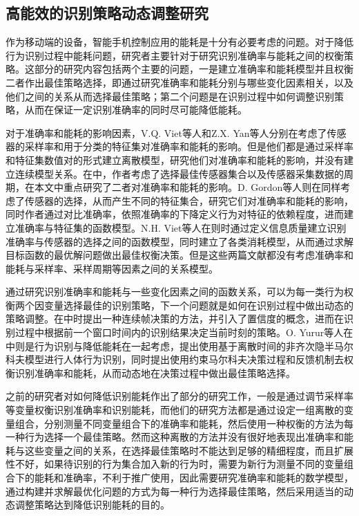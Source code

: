 \subsection{高能效的识别策略动态调整研究}
\par 作为移动端的设备，智能手机控制应用的能耗是十分有必要考虑的问题。对于降低行为识别过程中能耗问题，研究者主要针对于研究识别准确率与能耗之间的权衡策略。这部分的研究内容包括两个主要的问题，一是建立准确率和能耗模型并且权衡二者作出最佳策略选择，即通过研究准确率和能耗分别与哪些变化因素相关，以及他们之间的关系从而选择最佳策略；第二个问题是在识别过程中如何调整识别策略，从而在保证一定识别准确率的同时尽可能降低能耗。
\par 对于准确率和能耗的影响因素，V.Q. Viet等人和Z.X. Yan等人分别在\cite{fixPositionandOrientation2}\cite{modelVarialb}考虑了传感器的采样率和用于分类的特征集对准确率和能耗的影响。但是他们都是通过采样率和特征集数值对的形式建立离散模型，研究他们对准确率和能耗的影响，并没有建立连续模型关系。在\cite{sensorSet}中，作者考虑了选择最佳传感器集合以及传感器采集数据的周期，在本文中重点研究了二者对准确率和能耗的影响。D. Gordon等人则在\cite{sensorSetAndmodel}同样考虑了传感器的选择，从而产生不同的特征集合，研究它们对准确率和能耗的影响，同时作者通过对比准确率，依照准确率的下降定义行为对特征的依赖程度，进而建立准确率与特征集的函数模型。N.H. Viet等人在\cite{precionModel}则时通过定义信息质量建立识别准确率与传感器的选择之间的函数模型，同时建立了各类消耗模型，从而通过求解目标函数的最优解问题做出最佳权衡决策。但是这些两篇文献都没有考虑准确率和能耗与采样率、采样周期等因素之间的关系模型。
\par 通过研究识别准确率和能耗与一些变化因素之间的函数关系，可以为每一类行为权衡两个因变量选择最佳的识别策略，下一个问题就是如何在识别过程中做出动态的策略调整。在\cite{fixPositionandOrientation2}\cite{modelVarialb}中时提出一种连续帧决策的方法，并引入了置信度的概念，进而在识别过程中根据前一个窗口时间内的识别结果决定当前时刻的策略。O. Yurur等人在\cite{adapteStratery}中则是行为识别与降低能耗在一起考虑，提出使用基于离散时间的非齐次隐半马尔科夫模型进行人体行为识别，同时提出使用约束马尔科夫决策过程和反馈机制去权衡识别准确率和能耗，从而动态地在决策过程中做出最佳策略选择。
\par 之前的研究者对如何降低识别能耗作出了部分的研究工作，一般是通过调节采样率等变量权衡识别准确率和识别能耗，而他们的研究方法都是通过设定一组离散的变量组合，分别测量不同变量组合下的准确率和能耗，然后使用一种权衡的方法为每一种行为选择一个最佳策略。然而这种离散的方法并没有很好地表现出准确率和能耗与这些变量之间的关系，在选择最佳策略时不能达到足够的精细程度，而且扩展性不好，如果待识别的行为集合加入新的行为时，需要为新行为测量不同的变量组合下的能耗和准确率，不利于推广使用，因此需要研究准确率和能耗的数学模型，通过构建并求解最优化问题的方式为每一种行为选择最佳策略，然后采用适当的动态调整策略达到降低识别能耗的目的。
